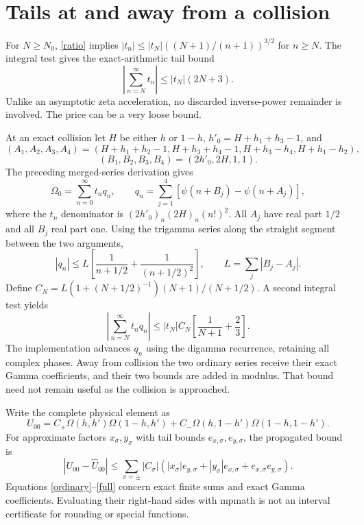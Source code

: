 \documentclass[11pt,a4paper]{article}
\newcommand{\Om}{\Omega}
\begin{document}
\newpage
\section{Tails at and away from a collision}
For $N\ge N_0$, \eqref{ratio} implies
$|t_n|\le |t_N|((N+1)/(n+1))^{3/2}$ for $n\ge N$.
The integral test gives the exact-arithmetic tail bound
\begin{equation}
 \left|\sum_{n=N}^{\infty}t_n\right|
 \le |t_N|(2N+3).
 \label{ordinary}
\end{equation}
Unlike an asymptotic zeta acceleration, no discarded inverse-power
remainder is involved. The price can be a very loose bound.

At an exact collision let $H$ be either $h$ or $1-h$,
$h'_0=H+h_1+h_3-1$, and
\[
 (A_1,A_2,A_3,A_4)
 =(H+h_1+h_2-1,H+h_3+h_4-1,H+h_3-h_4,H+h_1-h_2),
\]
\[
 (B_1,B_2,B_3,B_4)=(2h'_0,2H,1,1).
\]
The preceding merged-series derivation gives
\[
 \Om_0=\sum_{n=0}^{\infty}t_n q_n,\qquad
 q_n=\sum_{j=1}^4[\psi(n+B_j)-\psi(n+A_j)],
\]
where the $t_n$ denominator is $(2h'_0)_n(2H)_n(n!)^2$.
All $A_j$ have real part $1/2$ and all $B_j$ real part one.
Using the trigamma series \cite{dlmf5} along the straight segment between
the two arguments,
\[
 |q_n|\le L\left[\frac1{n+1/2}+\frac1{(n+1/2)^2}\right],
 \qquad L=\sum_j|B_j-A_j|.
\]
Define $C_N=L(1+(N+1/2)^{-1})(N+1)/(N+1/2)$.
A second integral test yields
\begin{equation}
 \left|\sum_{n=N}^{\infty}t_nq_n\right|
 \le |t_N|C_N\left[\frac1{N+1}+\frac23\right].
 \label{weighted}
\end{equation}
The implementation advances $q_n$ using the digamma recurrence, retaining
all complex phases. Away from collision the two ordinary series receive
their exact Gamma coefficients, and their two bounds are added in modulus.
That bound need not remain useful as the collision is approached.

Write the complete physical element as
\[
 U_{00}=C_+\Om(h,h')\Om(1-h,h')
       +C_-\Om(h,1-h')\Om(1-h,1-h').
\]
For approximate factors $x_\sigma,y_\sigma$ with tail bounds
$e_{x,\sigma},e_{y,\sigma}$, the propagated bound is
\begin{equation}
 |U_{00}-\widehat U_{00}|
 \le\sum_{\sigma=\pm}|C_\sigma|
 (|x_\sigma|e_{y,\sigma}+|y_\sigma|e_{x,\sigma}
                         +e_{x,\sigma}e_{y,\sigma}).
 \label{full}
\end{equation}
Equations \eqref{ordinary}--\eqref{full} concern exact finite sums and
exact Gamma coefficients. Evaluating their right-hand sides with
mpmath is not an interval certificate for rounding or special functions.
\end{document}
